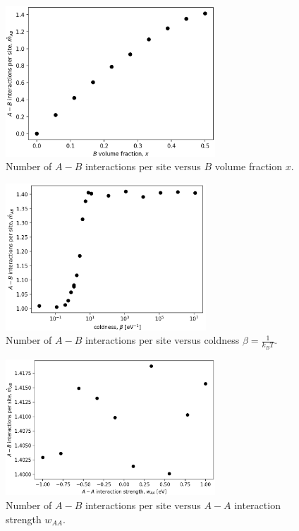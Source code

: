 \documentclass[10pt]{article}
\begin{document}
\begin{figure}[h!]
\centering
\includegraphics[width=0.70\textwidth]{Figures/m_AB_hat_versus_x.png}
\caption{Number of $A-B$ interactions per site versus $B$ volume fraction $x$.}
\label{fig:m_AB_hat_versus_x}
\end{figure}

\begin{figure}[h!]
\centering
\includegraphics[width=0.67\textwidth]{Figures/m_AB_hat_versus_beta.png}
\caption{Number of $A-B$ interactions per site versus coldness $\beta = \frac{1}{k_B T}$.}
\label{fig:m_AB_hat_versus_beta}
\end{figure}

\begin{figure}[h!]
\centering
\includegraphics[width=0.70\textwidth]{Figures/m_AB_hat_versus_w_AA.png}
\caption{Number of $A-B$ interactions per site versus $A-A$ interaction strength $w_{AA}$.}
\label{fig:m_AB_hat_versus_w_AA}
\end{figure}
\end{document}
